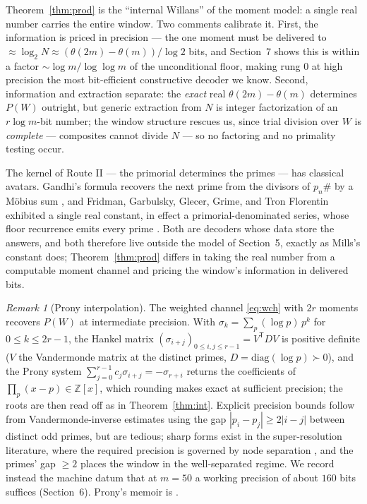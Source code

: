 \documentclass[11pt]{article}
\theoremstyle{remark}
\newtheorem{remark}{Remark}
\begin{document}
Theorem~\ref{thm:prod} is the ``internal Willans'' of the moment model: a single real number carries
the entire window. Two comments calibrate it. First, the information is priced in precision --- the
one moment must be delivered to $\approx \log_2 N \approx (\theta(2m)-\theta(m))/\log 2$ bits, and
Section~7 shows this is within a factor $\sim \log m / \log\log m$ of the unconditional floor, making
rung $0$ at high precision the most bit-efficient constructive decoder we know. Second, information
and extraction separate: the \emph{exact} real $\theta(2m)-\theta(m)$ determines $P(W)$ outright, but
generic extraction from $N$ is integer factorization of an $r\log m$-bit number; the window structure
rescues us, since trial division over $W$ is \emph{complete} --- composites cannot divide $N$ --- so
no factoring and no primality testing occur.

The kernel of Route II --- the primorial determines the primes --- has classical avatars. Gandhi's
formula recovers the next prime from the divisors of $p_n\#$ by a M\"obius sum
\cite{VandenEynden,Golomb}, and Fridman, Garbulsky, Glecer, Grime, and Tron Florentin exhibited a
single real constant, in effect a primorial-denominated series, whose floor recurrence emits every
prime \cite{Fridman}. Both are decoders whose data store the answers, and both therefore live outside
the model of Section~5, exactly as Mills's constant does; Theorem~\ref{thm:prod} differs in taking
the real number from a computable moment channel and pricing the window's information in delivered
bits.

\begin{remark}[Prony interpolation]\label{rem:prony}
The weighted channel \eqref{eq:wch} with $2r$ moments recovers $P(W)$ at intermediate precision. With
$\sigma_k = \sum_p (\log p)\, p^k$ for $0 \le k \le 2r-1$, the Hankel matrix
$(\sigma_{i+j})_{0 \le i, j \le r-1} = V^{\mathsf T} D V$ is positive definite ($V$ the Vandermonde
matrix at the distinct primes, $D = \mathrm{diag}(\log p) \succ 0$), and the Prony system
$\sum_{j=0}^{r-1} c_j \sigma_{i+j} = -\sigma_{r+i}$ returns the coefficients of
$\prod_p (x - p) \in \mathbb{Z}[x]$, which rounding makes exact at sufficient precision; the roots are
then read off as in Theorem~\ref{thm:int}. Explicit precision bounds follow from Vandermonde-inverse
estimates using the gap $|p_i - p_j| \ge 2|i - j|$ between distinct odd primes, but are tedious;
sharp forms exist in the super-resolution literature, where the required precision is governed by
node separation \cite{Moitra,BY}, and the primes' gap $\ge 2$ places the window in the
well-separated regime. We
record instead the machine datum that at $m = 50$ a working precision of about $160$ bits suffices
(Section~6). Prony's memoir is \cite{Prony}.
\end{remark}
\end{document}
